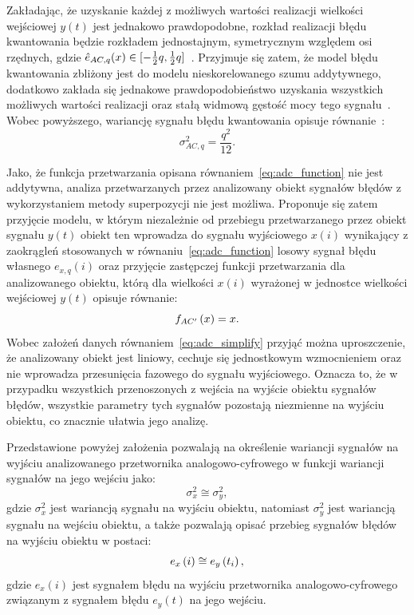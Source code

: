 Zakładając, że uzyskanie każdej z możliwych wartości realizacji wielkości wejściowej $y(t)$ jest jednakowo prawdopodobne, rozkład realizacji błędu kwantowania będzie rozkładem jednostajnym, symetrycznym względem osi rzędnych, gdzie $\hat{e}_{AC,q}(x) \in \interval{-\frac{1}{2} q}{\frac{1}{2} q}$~\cite{jakubiec_przetwarzanie, jakubiec_system, sienkowski_kwant}. Przyjmuje się zatem, że model błędu kwantowania zbliżony jest do modelu nieskorelowanego szumu addytywnego, dodatkowo zakłada się jednakowe prawdopodobieństwo uzyskania wszystkich możliwych wartości realizacji oraz stałą widmową gęstość mocy tego sygnału~\cite{gray_quantization, widrow_quantization}. Wobec powyższego, wariancję sygnału błędu kwantowania opisuje równanie~\cite{jcgm_guide}:
\begin{equation}
\sigma_{AC,q}^{2} = \frac{q^{2}}{12} \label{eq:adc_errvar}.
\end{equation}

Jako, że funkcja przetwarzania opisana równaniem~\eqref{eq:adc_function} nie jest addytywna, analiza przetwarzanych przez analizowany obiekt sygnałów błędów z wykorzystaniem metody superpozycji nie jest możliwa. Proponuje się zatem przyjęcie modelu, w którym niezależnie od przebiegu przetwarzanego przez obiekt sygnału $y(t)$ obiekt ten wprowadza do sygnału wyjściowego $x(i)$ wynikający z zaokrągleń stosowanych w równaniu~\eqref{eq:adc_function} losowy sygnał błędu własnego $e_{x,q}(i)$ oraz przyjęcie zastępczej funkcji przetwarzania dla analizowanego obiektu, którą dla wielkości $x(i)$ wyrażonej w jednostce wielkości wejściowej $y(t)$ opisuje równanie:
\begin{equation}
f_{AC'} \left(x\right) = x \label{eq:adc_simplify}.
\end{equation}
Wobec założeń danych równaniem~\eqref{eq:adc_simplify} przyjąć można uproszczenie, że analizowany obiekt jest liniowy, cechuje się jednostkowym wzmocnieniem oraz nie wprowadza przesunięcia fazowego do sygnału wyjściowego. Oznacza to, że w przypadku wszystkich przenoszonych z wejścia na wyjście obiektu sygnałów błędów, wszystkie parametry tych sygnałów pozostają niezmienne na wyjściu obiektu, co znacznie ułatwia jego analizę.

Przedstawione powyżej założenia pozwalają na określenie wariancji sygnałów na wyjściu analizowanego przetwornika analogowo-cyfrowego w funkcji wariancji sygnałów na jego wejściu jako:
\begin{equation}
\sigma_{x}^{2} \cong \sigma_{y}^{2} \label{eq:adc_varout},
\end{equation}
gdzie $\sigma_{x}^{2}$ jest wariancją sygnału na wyjściu obiektu, natomiast $\sigma_{y}^{2}$ jest wariancją sygnału na wejściu obiektu, a także pozwalają opisać przebieg sygnałów błędów na wyjściu obiektu w postaci:
\begin{equation}
e_{x} \left(i\right) \cong e_{y} \left(t_{i}\right) \label{eq:adc_errout},
\end{equation}
gdzie $e_{x}(i)$ jest sygnałem błędu na wyjściu przetwornika analogowo-cyfrowego związanym z sygnałem błędu $e_{y}(t)$ na jego wejściu.


